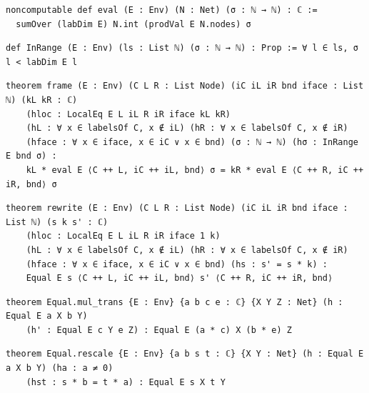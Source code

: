 \begin{lstlisting}[style=leancore]
noncomputable def eval (E : Env) (N : Net) (σ : ℕ → ℕ) : ℂ :=
  sumOver (labDim E) N.int (prodVal E N.nodes) σ
\end{lstlisting}
\begin{lstlisting}[style=leancore]
def InRange (E : Env) (ls : List ℕ) (σ : ℕ → ℕ) : Prop := ∀ l ∈ ls, σ l < labDim E l
\end{lstlisting}
\begin{lstlisting}[style=leancore]
theorem frame (E : Env) (C L R : List Node) (iC iL iR bnd iface : List ℕ) (kL kR : ℂ)
    (hloc : LocalEq E L iL R iR iface kL kR)
    (hL : ∀ x ∈ labelsOf C, x ∉ iL) (hR : ∀ x ∈ labelsOf C, x ∉ iR)
    (hface : ∀ x ∈ iface, x ∈ iC ∨ x ∈ bnd) (σ : ℕ → ℕ) (hσ : InRange E bnd σ) :
    kL * eval E ⟨C ++ L, iC ++ iL, bnd⟩ σ = kR * eval E ⟨C ++ R, iC ++ iR, bnd⟩ σ
\end{lstlisting}
\begin{lstlisting}[style=leancore]
theorem rewrite (E : Env) (C L R : List Node) (iC iL iR bnd iface : List ℕ) (s k s' : ℂ)
    (hloc : LocalEq E L iL R iR iface 1 k)
    (hL : ∀ x ∈ labelsOf C, x ∉ iL) (hR : ∀ x ∈ labelsOf C, x ∉ iR)
    (hface : ∀ x ∈ iface, x ∈ iC ∨ x ∈ bnd) (hs : s' = s * k) :
    Equal E s ⟨C ++ L, iC ++ iL, bnd⟩ s' ⟨C ++ R, iC ++ iR, bnd⟩
\end{lstlisting}
\begin{lstlisting}[style=leancore]
theorem Equal.mul_trans {E : Env} {a b c e : ℂ} {X Y Z : Net} (h : Equal E a X b Y)
    (h' : Equal E c Y e Z) : Equal E (a * c) X (b * e) Z
\end{lstlisting}
\begin{lstlisting}[style=leancore]
theorem Equal.rescale {E : Env} {a b s t : ℂ} {X Y : Net} (h : Equal E a X b Y) (ha : a ≠ 0)
    (hst : s * b = t * a) : Equal E s X t Y
\end{lstlisting}

